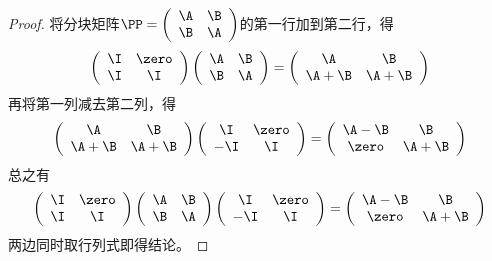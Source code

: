 \begin{frame}\ft{\secname}
\begin{proof}

  将分块矩阵$
  \PP = 
  \left(
    \begin{array}{cc}
      \A&\B\\
      \B&\A
    \end{array}
  \right)$的第一行加到第二行，得\pause
  $$
  \left(
    \begin{array}{cc}
      \I & \zero\\
      \I & \I
    \end{array}
  \right) \left(
    \begin{array}{cc}
      \A&\B\\
      \B&\A
    \end{array}
  \right) = \left(
    \begin{array}{cc}
      \A&\B\\
      \A+\B&\A+\B
    \end{array}
  \right)
  $$\pause
  再将第一列减去第二列，得\pause
  $$
  \left(
    \begin{array}{cc}
      \A&\B\\
      \A+\B&\A+\B
    \end{array}
  \right) \left(
    \begin{array}{cc}
      \I&\zero\\
      -\I&\I
    \end{array}
  \right) = \left(
    \begin{array}{cc}
      \A-\B & \B\\
      \zero & \A+\B
    \end{array}
  \right)
  $$\pause
  总之有
  $$
  \left(
    \begin{array}{cc}
      \I & \zero\\
      \I & \I
    \end{array}
  \right) \left(
    \begin{array}{cc}
      \A&\B\\
      \B&\A
    \end{array}
  \right) 
  \left(
    \begin{array}{cc}
      \I&\zero\\
      -\I&\I
    \end{array}
  \right) = \left(
    \begin{array}{cc}
      \A-\B & \B\\
      \zero & \A+\B
    \end{array}
  \right)
  $$
  两边同时取行列式即得结论。
\end{proof}
\end{frame}

